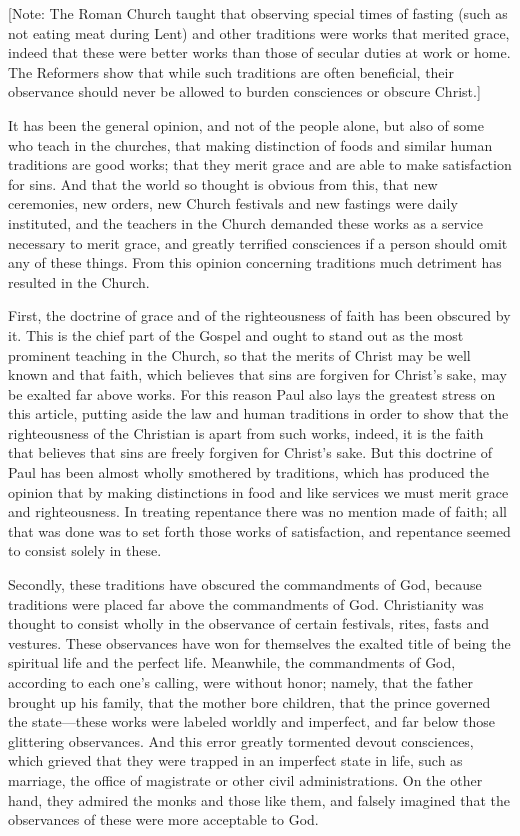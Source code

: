 [Note: The Roman Church taught that observing special times of fasting (such as not eating meat during Lent) and other traditions were works that merited grace, indeed that these were better works than those of secular duties at work or home. The Reformers show that while such traditions are often beneficial, their observance should never be allowed to burden consciences or obscure Christ.]

It has been the general opinion, and not of the people alone, but also of some who teach in the churches, that making distinction of foods and similar human traditions are good works; that they merit grace and are able to make satisfaction for sins. And that the world so thought is obvious from this, that new ceremonies, new orders, new Church festivals and new fastings were daily instituted, and the teachers in the Church demanded these works as a service necessary to merit grace, and greatly terrified consciences if a person should omit any of these things. From this opinion concerning traditions much detriment has resulted in the Church.

First, the doctrine of grace and of the righteousness of faith has been obscured by it. This is the chief part of the Gospel and ought to stand out as the most prominent teaching in the Church, so that the merits of Christ may be well known and that faith, which believes that sins are forgiven for Christ’s sake, may be exalted far above works. For this reason Paul also lays the greatest stress on this article, putting aside the law and human traditions in order to show that the righteousness of the Christian is apart from such works, indeed, it is the faith that believes that sins are freely forgiven for Christ’s sake. But this doctrine of Paul has been almost wholly smothered by traditions, which has produced the opinion that by making distinctions in food and like services we must merit grace and righteousness. In treating repentance there was no mention made of faith; all that was done was to set forth those works of satisfaction, and repentance seemed to consist solely in these.

Secondly, these traditions have obscured the commandments of God, because traditions were placed far above the commandments of God. Christianity was thought to consist wholly in the observance of certain festivals, rites, fasts and vestures. These observances have won for themselves the exalted title of being the spiritual life and the perfect life. Meanwhile, the commandments of God, according to each one’s calling, were without honor; namely, that the father brought up his family, that the mother bore children, that the prince governed the state—these works were labeled worldly and imperfect, and far below those glittering observances. And this error greatly tormented devout consciences, which grieved that they were trapped in an imperfect state in life, such as marriage, the office of magistrate or other civil administrations. On the other hand, they admired the monks and those like them, and falsely imagined that the observances of these were more acceptable to God.

